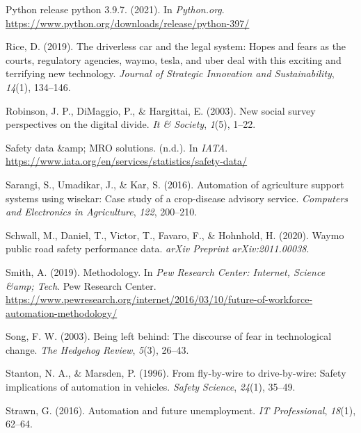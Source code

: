 \documentclass[
  man]{apa7}
\newlength{\cslhangindent}
\newlength{\cslentryspacingunit} %
\newenvironment{CSLReferences}[2] %
 {%
  \setlength{\parindent}{0pt}
  \ifodd #1
  \let\oldpar\par
  \def\par{\hangindent=\cslhangindent\oldpar}
  \fi
  \setlength{\parskip}{#2\cslentryspacingunit}
 }%
 {}
\begin{document}
\begin{CSLReferences}{1}{0}
\leavevmode{}%
Python release python 3.9.7. (2021). In \emph{Python.org}. \url{https://www.python.org/downloads/release/python-397/}

\leavevmode{}%
Rice, D. (2019). The driverless car and the legal system: Hopes and fears as the courts, regulatory agencies, waymo, tesla, and uber deal with this exciting and terrifying new technology. \emph{Journal of Strategic Innovation and Sustainability}, \emph{14}(1), 134--146.

\leavevmode{}%
Robinson, J. P., DiMaggio, P., \& Hargittai, E. (2003). New social survey perspectives on the digital divide. \emph{It \& Society}, \emph{1}(5), 1--22.

\leavevmode{}%
Safety data \&amp; MRO solutions. (n.d.). In \emph{IATA}. \url{https://www.iata.org/en/services/statistics/safety-data/}

\leavevmode{}%
Sarangi, S., Umadikar, J., \& Kar, S. (2016). Automation of agriculture support systems using wisekar: Case study of a crop-disease advisory service. \emph{Computers and Electronics in Agriculture}, \emph{122}, 200--210.

\leavevmode{}%
Schwall, M., Daniel, T., Victor, T., Favaro, F., \& Hohnhold, H. (2020). Waymo public road safety performance data. \emph{arXiv Preprint arXiv:2011.00038}.

\leavevmode{}%
Smith, A. (2019). Methodology. In \emph{Pew Research Center: Internet, Science \&amp; Tech}. Pew Research Center. \url{https://www.pewresearch.org/internet/2016/03/10/future-of-workforce-automation-methodology/}

\leavevmode{}%
Song, F. W. (2003). Being left behind: The discourse of fear in technological change. \emph{The Hedgehog Review}, \emph{5}(3), 26--43.

\leavevmode{}%
Stanton, N. A., \& Marsden, P. (1996). From fly-by-wire to drive-by-wire: Safety implications of automation in vehicles. \emph{Safety Science}, \emph{24}(1), 35--49.

\leavevmode{}%
Strawn, G. (2016). Automation and future unemployment. \emph{IT Professional}, \emph{18}(1), 62--64.


\end{CSLReferences}
\end{document}
